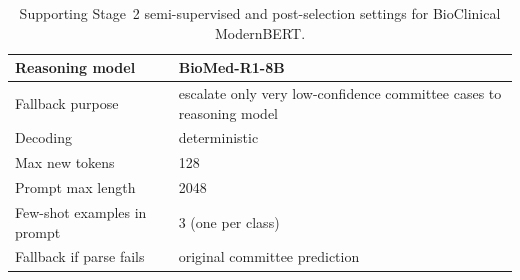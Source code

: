 \begin{table}[htbp]
\begin{tabularx}{\columnwidth}{|l|X|}
\hline
Reasoning model & BioMed-R1-8B \\
\hline
Fallback purpose & escalate only very low-confidence committee cases to reasoning model \\
\hline
Decoding & deterministic \\
\hline
Max new tokens & 128 \\
\hline
Prompt max length & 2048 \\
\hline
Few-shot examples in prompt & 3 (one per class) \\
\hline
Fallback if parse fails & original committee prediction \\
\hline
\end{tabularx}
\caption{Supporting Stage~2 semi-supervised and post-selection settings for BioClinical ModernBERT.}
\label{tab:bcb_appendix_stage2}
\end{table}


\begin{table}[H]
\centering
\caption{Upstream route-selection summary for Experiment 2. The masked-adaptation route was rejected because it did not improve downstream three-class QA. The binary weak-label stage uses only \textit{yes}/\textit{no}, so \textit{maybe} is not applicable there.}
\label{tab:bcb_route_summary}
\small
{}
\end{table}


